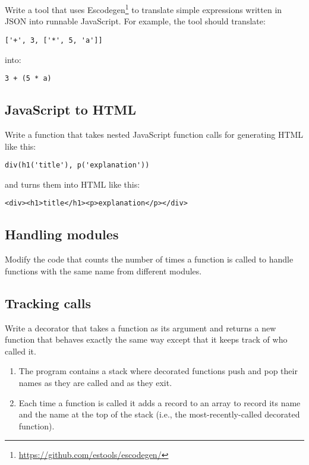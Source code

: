 \documentclass[krantzl]{krantz}
\newcommand{\hreffoot}[2]{{#1}\footnote{\href{#2}{#2}}}
\begin{document}
Write a tool that uses \hreffoot{Escodegen}{https://github.com/estools/escodegen/}
to translate simple expressions written in JSON into runnable JavaScript.
For example, the tool should translate:

\begin{lstlisting}[frame=tblr]
['+', 3, ['*', 5, 'a']]
\end{lstlisting}


\noindent into:

\begin{lstlisting}[frame=tblr]
3 + (5 * a)
\end{lstlisting}

\subsection*{JavaScript to HTML}


Write a function that takes nested JavaScript function calls for generating HTML like this:

\begin{lstlisting}[frame=tblr]
div(h1('title'), p('explanation'))
\end{lstlisting}


\noindent and turns them into HTML like this:

\begin{lstlisting}[frame=tblr]
<div><h1>title</h1><p>explanation</p></div>
\end{lstlisting}

\subsection*{Handling modules}


Modify the code that counts the number of times a function is called
to handle functions with the same name from different modules.

\subsection*{Tracking calls}


Write a decorator that takes a function as its argument
and returns a new function that behaves exactly the same way
except that it keeps track of who called it.

\begin{enumerate}

\item 

The program contains a stack where decorated functions push and pop their names
    as they are called and as they exit.



\item 

Each time a function is called
    it adds a record to an array to record its name and the name at the top of the stack
    (i.e., the most-recently-called decorated function).



\end{enumerate}
\end{document}

